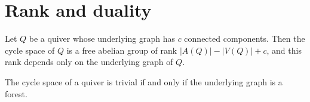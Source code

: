 \section{Rank and duality}\label{Arden24-sec-3}

\begin{theorem}\label{Arden24-thm-3.1}
\label{Arden24-thm:rank}
Let $Q$ be a quiver whose underlying graph has $c$ connected components. Then the cycle space of $Q$ is a free abelian group of rank $|A(Q)| - |V(Q)| + c$, and this rank depends only on the underlying graph of $Q$.
\end{theorem}

\begin{corollary}\label{Arden24-cor-3.2}
\label{Arden24-cor:forest}
The cycle space of a quiver is trivial if and only if the underlying graph is a forest.
\end{corollary}

